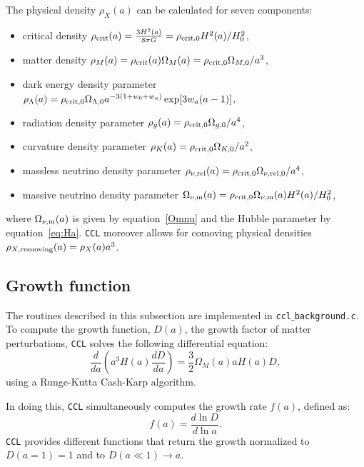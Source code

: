 \documentclass[\docopts]{\docclass}
\newcommand{\ccl}{{\tt CCL}\xspace}
\begin{document}
The physical density $\rho_X(a)$ can be calculated for seven components:
\begin{itemize}
\item critical density $\rho_{\rm crit}(a) = {{3 H^2(a)} \over { 8 \pi G}} = \rho_{\rm crit,0} H^2(a) / H_0^2$,
\item matter density $\rho_M(a) = \rho_{\rm crit}(a) \Omega_M(a) = \rho_{\rm crit,0} \Omega_{M,0} / a^{3}$,
\item dark energy density parameter $\rho_\Lambda(a) = \rho_{\rm crit,0} \Omega_{\Lambda,0} a^{-3(1+w_0+w_a)} \exp[3 w_a (a-1)]$,
\item radiation density parameter $\rho_g(a) = \rho_{\rm crit,0} \Omega_{g,0} / a^{4}$,
\item curvature density parameter $\rho_K(a) = \rho_{\rm crit,0} \Omega_{K,0} / a^{2}$,
\item massless neutrino density parameter $\rho_{\nu, {\rm rel}}(a) = \rho_{\rm crit,0} \Omega_{\nu, {\rm rel},0} / a^{4}$,
\item massive neutrino density parameter $\Omega_{\nu, {\rm m}}(a) = \rho_{\rm crit,0} \Omega_{\nu, {\rm m}}(a) H^2(a) / H_0^2$,
\end{itemize}
where $\Omega_{\nu, {\rm m}}(a)$ is given by equation~\ref{Omnu} and the Hubble parameter by equation~\ref{eq:Ha}. \ccl moreover allows for comoving physical densities $\rho_{X, {\rm comoving}}(a) = \rho_X(a) a^3$.


\subsection{Growth function}
\label{sec:growth}

The routines described in this subsection are implemented in {\tt ccl$\_$background.c}.
To compute the growth function, $D(a)$, the growth factor of matter perturbations, \ccl solves the following differential equation:
\begin{equation}
  \frac{d}{da}\left(a^3H(a)\frac{dD}{da}\right)=\frac{3}{2}\Omega_M(a)aH(a)D,
\end{equation}
using a Runge-Kutta Cash-Karp algorithm.

In doing this, \ccl simultaneously computes the growth rate $f(a)$, defined as:
\begin{equation}
  f(a)=\frac{d\ln D}{d\ln a}.
\end{equation}
\ccl provides different functions that return the growth normalized to $D(a=1)=1$ and to $D(a\ll1)\rightarrow a$.
\end{document}
